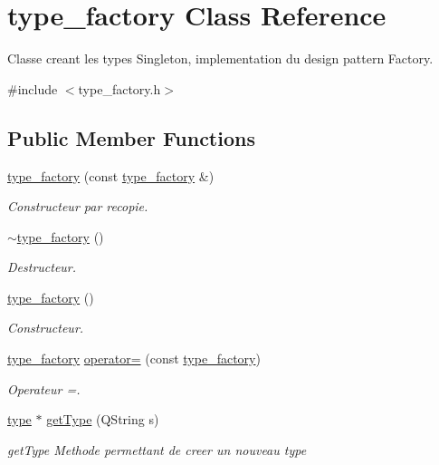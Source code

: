\hypertarget{classtype__factory}{\section{type\-\_\-factory Class Reference}
\label{classtype__factory}
}


Classe creant les types Singleton, implementation du design pattern Factory.  




{\ttfamily \#include $<$type\-\_\-factory.\-h$>$}

\subsection*{Public Member Functions}
\begin{DoxyCompactItemize}
\item 
\hyperlink{classtype__factory_a1782f22ec406749b83ba6c43b17e4d7f}{type\-\_\-factory} (const \hyperlink{classtype__factory}{type\-\_\-factory} \&)
\begin{DoxyCompactList}\small\item\em Constructeur par recopie. \end{DoxyCompactList}\item 
\hyperlink{classtype__factory_a3864904dd1a85d5df74da4675598acae}{$\sim$type\-\_\-factory} ()
\begin{DoxyCompactList}\small\item\em Destructeur. \end{DoxyCompactList}\item 
\hyperlink{classtype__factory_a48e3bffea0219e1ca2fc05463c6981ac}{type\-\_\-factory} ()
\begin{DoxyCompactList}\small\item\em Constructeur. \end{DoxyCompactList}\item 
\hyperlink{classtype__factory}{type\-\_\-factory} \hyperlink{classtype__factory_a632504653d9667aced28366b82a25e92}{operator=} (const \hyperlink{classtype__factory}{type\-\_\-factory})
\begin{DoxyCompactList}\small\item\em Operateur =. \end{DoxyCompactList}\item 
\hyperlink{classtype}{type} $\ast$ \hyperlink{classtype__factory_a144da545ae1616b3e9e644ad0df9564c}{get\-Type} (Q\-String s)
\begin{DoxyCompactList}\small\item\em get\-Type Methode permettant de creer un nouveau type \end{DoxyCompactList}\end{DoxyCompactItemize}

